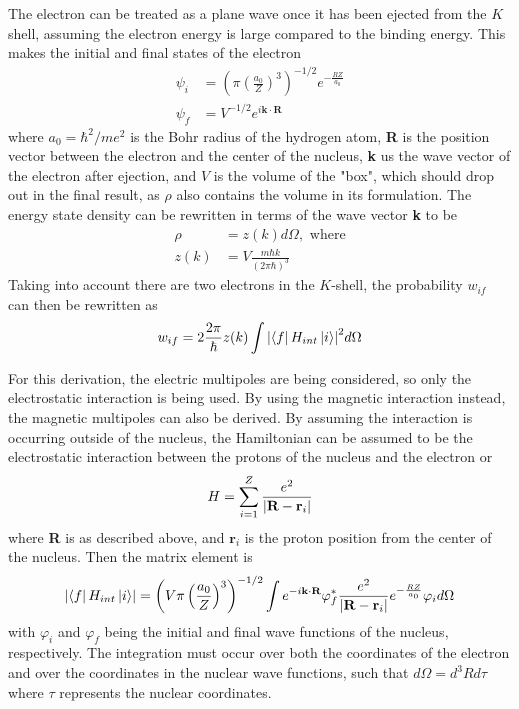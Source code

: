 The electron can be treated as a plane wave once it has been ejected from the $K$ shell, assuming the electron energy is large compared to the binding energy. This makes the initial and final states of the electron
\begin{subequations}
\begin{align}
    \psi_{i} & = \left(\pi\left(\frac{a_0}{Z}\right)^3\right)^{-1/2}e^{-\frac{RZ}{a_0}}\\
    \psi_{f} & = V^{-1/2}e^{i\textbf{k}\cdot\textbf{R}}
\end{align}
\end{subequations}
where $a_0=\hbar^2/me^2$ is the Bohr radius of the hydrogen atom, \textbf{R} is the position vector between the electron and the center of the nucleus, \textbf{k} us the wave vector of the electron after ejection, and $V$ is the volume of the "box", which should drop out in the final result, as $\rho$ also contains the volume in its formulation. The energy state density can be rewritten in terms of the wave vector \textbf{k} to be 
\begin{align}
    \rho & = z(k)d\Omega, \text{ where} \\
    z(k) & = V\frac{m\hbar k}{(2\pi\hbar)^3}
\end{align}
Taking into account there are two electrons in the $K$-shell, the probability $w_{if}$ can then be rewritten as
\begin{equation}
\label{eq:golden_ic}
    w_{if}=2 \frac{2\pi}{\hbar}z(k)\int\abs{\bra{f}H_{int}\ket{i}}^2d\Omega
\end{equation}

For this derivation, the electric multipoles are being considered, so only the electrostatic interaction is being used. By using the magnetic interaction instead, the magnetic multipoles can also be derived. By assuming the interaction is occurring outside of the nucleus, the Hamiltonian can be assumed to be the electrostatic interaction between the protons of the nucleus and the electron or
\begin{equation}
    H=\sum_{i=1}^Z \frac{e^2}{\abs{\textbf{R}-\textbf{r}_i}}
\end{equation}
where \textbf{R} is as described above, and $\textbf{r}_i$ is the proton position from the center of the nucleus. Then the matrix element is
\begin{equation}
\label{eq:matrix_element_int}
    \abs{\bra{f}H_{int}\ket{i}} = \left(V\pi\left(\frac{a_0}{Z}\right)^3\right)^{-1/2}\int e^{-i\textbf{k}\cdot\textbf{R}}\varphi_{f}^* \frac{e^2}{\abs{\textbf{R}-\textbf{r}_i}} e^{-\frac{RZ}{a_0}}\varphi_{i}d\Omega
\end{equation}
with $\varphi_{i}$ and $\varphi_{f}$ being the initial and final wave functions of the nucleus, respectively. The integration must occur over both the coordinates of the electron and over the coordinates in the nuclear wave functions, such that $d\Omega=d^3Rd\tau$ where $\tau$ represents the nuclear coordinates.


